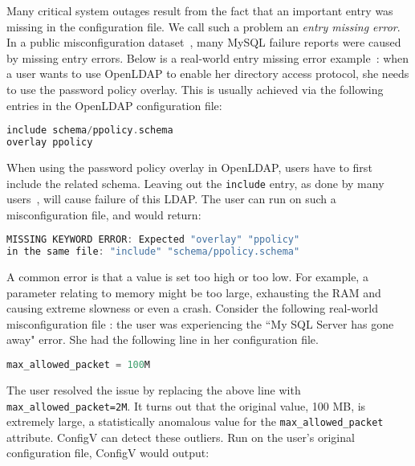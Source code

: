 Many critical system outages result from the fact that an important
entry was missing in the configuration file. 
We call such a problem an {\em entry missing error}.
In a public misconfiguration dataset~\cite{configdataset},
many MySQL failure reports were caused by
missing entry errors.
Below is a real-world entry missing error example~\cite{yin11anempirical}:
when a user wants to use OpenLDAP to enable her directory access
protocol, she needs to use the password policy overlay. This is usually
achieved via the following entries in the OpenLDAP configuration file:

\begin{lstlisting}[language=C, xleftmargin=.01\textwidth]
include schema/ppolicy.schema
overlay ppolicy
\end{lstlisting} 

When using the password policy overlay in OpenLDAP, 
users have to first include the related schema.
Leaving out the {\tt include} entry, 
as done by many users~\cite{yin11anempirical}, 
will cause failure of this LDAP. 
The user can run \app on such a misconfiguration file,
and \app would return:

\begin{lstlisting}[language=C, xleftmargin=.01\textwidth]
MISSING KEYWORD ERROR: Expected "overlay" "ppolicy"
in the same file: "include" "schema/ppolicy.schema"
\end{lstlisting} 

A common error is that a value is set too high or too low.
For example, a parameter relating to memory might be too large,
exhausting the RAM and causing extreme slowness or even a crash. 
Consider the following real-world misconfiguration file \cite{singleValue}: the
user was experiencing the ``My SQL Server has gone away" error.  
She had the following line in her configuration file.

\begin{lstlisting}[language=C, xleftmargin=.01\textwidth]
max_allowed_packet = 100M
\end{lstlisting} 

The user resolved the issue by replacing the above line with {\tt max\_allowed\_packet=2M}. 
It turns out that the original value, 100 MB, is extremely large, a  
statistically anomalous value for the {\tt max\_allowed\_packet} attribute. ConfigV can detect these
outliers. Run on the user's original configuration file, ConfigV would output:


